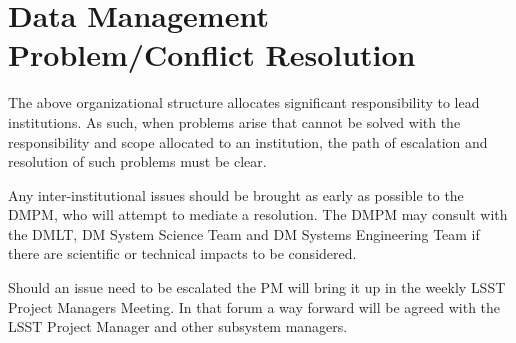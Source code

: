 \section{Data Management Problem/Conflict Resolution }
The above organizational structure allocates significant responsibility to lead institutions.
As such, when problems arise that cannot be solved with the responsibility and scope allocated to an institution, the path of escalation and resolution of such problems must be clear.

Any inter-institutional issues should be brought as early as possible to the \gls{DMPM}, who will attempt to mediate a resolution.
The \gls{DMPM} may consult with the \gls{DMLT}, DM System Science Team and DM \gls{Systems Engineering} Team if there are scientific or technical impacts to be considered.

Should an issue need to be escalated the \gls{PM} will bring it up in the weekly \gls{LSST} Project Managers Meeting.
In that forum a way forward will be agreed with the \gls{LSST} \gls{Project Manager} and other subsystem managers.
